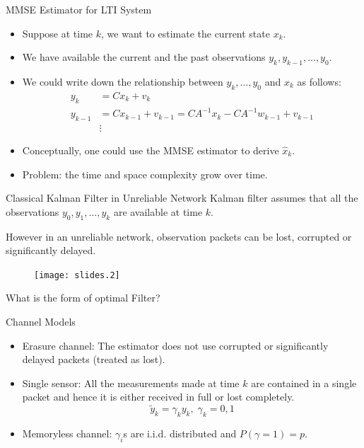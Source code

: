 \documentclass[10pt]{beamer}
\DeclareMathOperator{\1}{\textbf{1}}
\begin{document}
  \begin{frame}{MMSE Estimator for LTI System}
    \begin{itemize}
      \item Suppose at time $k$, we want to estimate the current state $x_k$.
      \item We have available the current and the past observations $y_k,y_{k-1},\dots,y_0$.
      \item We could write down the relationship between $y_k,\dots,y_0$ and $x_k$ as follows:
	\begin{displaymath}
	  \begin{split}
	    y_k& = C x_k + v_k \\
	    y_{k-1} & = Cx_{k-1}+v_{k-1} = CA^{-1}x_k -C A^{-1}w_{k-1} + v_{k-1}\\
	    &\vdots
	  \end{split}
	\end{displaymath}
      \item Conceptually, one could use the MMSE estimator to derive $\hat x_k$.
      \item Problem: the time and space complexity grow over time.
    \end{itemize}
  \end{frame}


  \begin{frame}{Classical Kalman Filter in Unreliable Network}
    Kalman filter assumes that all the observations $y_0,y_1,\ldots,y_k$ are available at time $k$.

    However in an unreliable network, observation packets can be lost, corrupted or significantly delayed.
    \begin{figure}[<h>]
      \begin{center}
	\texttt{[image: slides.2]}
      \end{center}
    \end{figure}
    What is the form of optimal Filter? 
  \end{frame}

  \begin{frame}{Channel Models}  
    \begin{itemize}
      \item Erasure channel: The estimator does not use corrupted or significantly delayed packets (treated as lost). 
      \item Single sensor: All the measurements made at time $k$ are contained in a single packet and hence it is either received in full or lost completely.
	\[
	\widetilde y_k = \gamma_k y_k,\;\gamma_k=0,1
	\]
      \item Memoryless channel: $\gamma_i$s are i.i.d. distributed and $P(\gamma = 1) = p$.
    \end{itemize}
  \end{frame}
\end{document}
